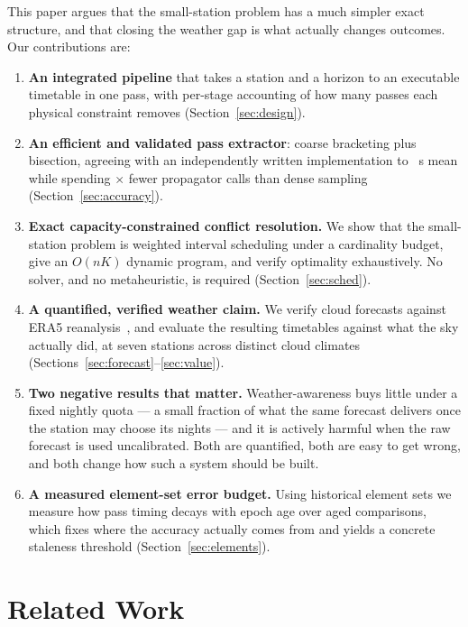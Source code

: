 \documentclass[conference]{IEEEtran}
\begin{document}
This paper argues that the small-station problem has a much simpler exact
structure, and that closing the weather gap is what actually changes outcomes.
Our contributions are:

\begin{enumerate}
\item \textbf{An integrated pipeline} that takes a station and a horizon to an
      executable timetable in one pass, with per-stage accounting of how many
      passes each physical constraint removes (Section~\ref{sec:design}).
\item \textbf{An efficient and validated pass extractor}: coarse bracketing plus
      bisection, agreeing with an independently written implementation to
      \SkyfieldTca~s mean while spending \CallReduction$\times$ fewer propagator
      calls than dense sampling (Section~\ref{sec:accuracy}).
\item \textbf{Exact capacity-constrained conflict resolution.} We show that the
      small-station problem is weighted interval scheduling under a cardinality
      budget, give an $O(nK)$ dynamic program, and verify optimality
      exhaustively. No solver, and no metaheuristic, is required
      (Section~\ref{sec:sched}).
\item \textbf{A quantified, verified weather claim.} We verify cloud forecasts
      against ERA5 reanalysis~\cite{hersbach2020era5}, and evaluate the resulting
      timetables against what the sky actually did, at seven stations across
      distinct cloud climates (Sections~\ref{sec:forecast}--\ref{sec:value}).
\item \textbf{Two negative results that matter.} Weather-awareness buys little
      under a fixed nightly quota --- a small fraction of what the same forecast
      delivers once the station may choose its nights --- and it is actively
      harmful when the raw forecast is used uncalibrated. Both are quantified,
      both are easy to get wrong, and both change how such a system should be
      built.
\item \textbf{A measured element-set error budget.} Using historical element
      sets we measure how pass timing decays with epoch age over
      \AgeComparisons{} aged comparisons, which fixes where the accuracy
      actually comes from and yields a concrete staleness threshold
      (Section~\ref{sec:elements}).
\end{enumerate}

\section{Related Work}
\end{document}

